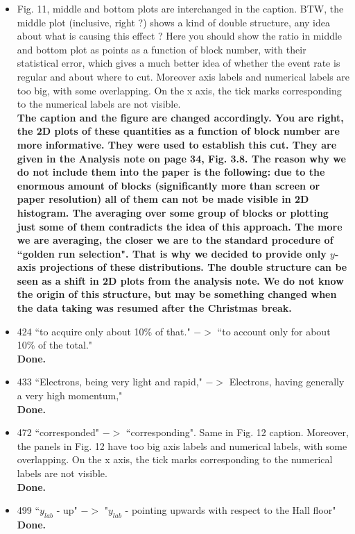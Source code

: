 \documentclass[,superscriptaddress,showpacs,amssymb,amsmath,amsfonts,linenumbers,article]{revtex4-1}
\begin{document}
\begin{itemize}
\item Fig. 11, middle and bottom plots are interchanged in the caption. BTW, the middle plot (inclusive, right ?) shows a kind of double structure, any idea about what is causing this effect ? Here you should show the ratio in middle and bottom plot as points as a function of block number, with their statistical error, which gives a much better idea of whether the event rate is regular and about where to cut. Moreover axis labels and numerical labels are too big, with some overlapping. On the x axis, the tick marks corresponding to the numerical labels are not visible.\\
{\bf The caption and the figure are changed accordingly. You are right, the 2D plots of these quantities as a function of block number are more informative. They were used to establish this cut. They are given in the Analysis note on page 34, Fig. 3.8. The reason why we do not include them into the paper is the following: due to the enormous amount of blocks (significantly more than screen or paper resolution) all of them can not be made visible in 2D histogram. The averaging over some group of blocks or plotting just some of them contradicts the idea of this approach. The more we are averaging, the closer we are to the standard procedure of ``golden run selection". That is why we decided to provide only $y$-axis projections of these distributions. The double structure can be seen as a shift in 2D plots from the analysis note. We do not know the origin of this structure, but may be something changed when the data taking was resumed after the Christmas break.   
}


\item 424 ``to acquire only about 10\% of that." $->$ ``to account only for about 10\% of the total."\\
{\bf Done.}

\item 433 ``Electrons, being very light and rapid," $->$ Electrons, having generally a very high momentum,"\\
{\bf Done.}

\item 472 ``corresponded" $->$ ``corresponding". Same in Fig. 12 caption. Moreover, the panels in Fig. 12 have too big axis labels and numerical labels, with some overlapping. On the x axis, the tick marks corresponding to the numerical labels are not visible.\\
{\bf Done.}

\item 499 ``$y_{lab}$ - up" $->$ "$y_{lab}$ - pointing upwards with respect to the Hall floor"\\[0.5cm]
{\bf Done.}


\end{itemize}
\end{document}
